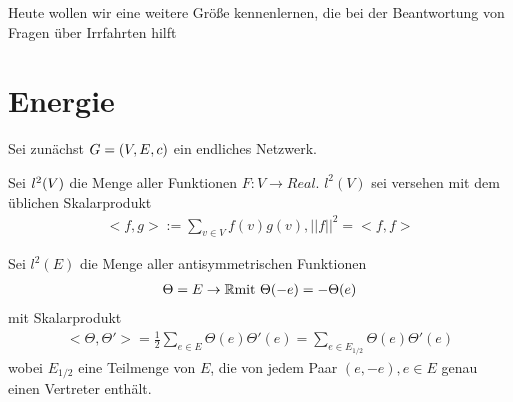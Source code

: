 
Heute wollen wir eine weitere Größe kennenlernen, die bei der Beantwortung von Fragen über Irrfahrten hilft

\section{Energie}
Sei zunächst $G = \left(V,E,c\right)$ ein endliches Netzwerk.
\begin{definition}
	Sei $l^2\enb{V}$ die Menge aller Funktionen $F: V \to Real$. $l^2(V)$ sei versehen mit dem üblichen Skalarprodukt 
	\begin{gather}
		<f,g> := \sum\limits_{v \in V} f(v)g(v), ||f||^2 = <f,f>
	\end{gather}	
\end{definition}
\begin{definition}
	Sei $l^2(E)$ die Menge aller antisymmetrischen Funktionen 
	\begin{gather}
		\Theta = E \to \mathbb{R} \text{mit } \Theta(-e) = -\Theta(e)
	\end{gather}
	mit Skalarprodukt 
	\begin{gather}
		<\Theta,\Theta'> = \frac{1}{2}\sum\limits_{e \in E} \Theta(e) \Theta'(e) = \sum\limits_{e \in E_{1/2}} \Theta(e)\Theta'(e)
	\end{gather}
	wobei $E_{1/2}$ eine Teilmenge von $E$, die von jedem Paar $(e,-e), e \in E$ genau einen Vertreter enthält.
\end{definition}

